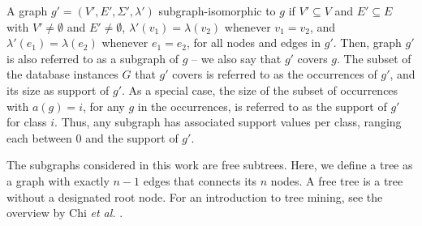 \documentclass{article}
\begin{document}
A graph $g'=(V',E',\Sigma',\lambda')$ subgraph-isomorphic to $g$ if $V'
\subseteq V$ and $E' \subseteq E$ with $V' \ne \emptyset$ and $E' \ne
\emptyset$, $\lambda'(v_1)=\lambda(v_2)$ whenever $v_1=v_2$, and
$\lambda'(e_1)=\lambda(e_2)$ whenever $e_1=e_2$, for all nodes and edges in
$g'$. Then, graph $g'$ is also referred to as a subgraph of $g$ -- we also say
that $g'$ covers $g$.  The subset of the database instances $G$ that $g'$
covers is referred to as the occurrences of $g'$, and its size as support of
$g'$.  As a special case, the size of the subset of occurrences with $a(g)=i$,
for any $g$ in the occurrences, is referred to as the support of $g'$ for class
$i$. Thus, any subgraph has associated support values per class, ranging each
between 0 and the support of $g'$.

The subgraphs considered in this work are free subtrees. Here, we define a tree
as a graph with exactly $n-1$ edges that connects its $n$ nodes. A free tree is
a tree without a designated root node. For an introduction to tree mining, see
the overview by Chi \emph{et al.} \cite{CMNK01Frequent}.
\end{document}
